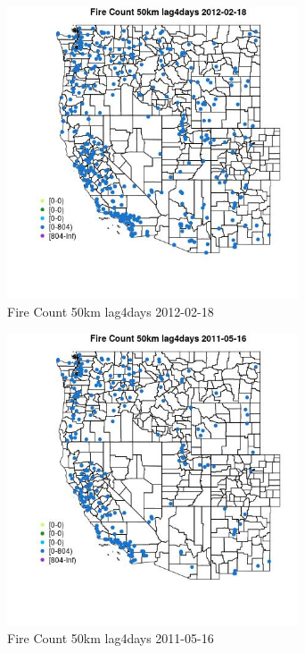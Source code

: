 \begin{figure} 
\centering  
\includegraphics[width=0.77\textwidth]{Code_Outputs/Report_ML_input_PM25_Step4_part_f_de_duplicated_aveswNAs_MapObsFire_Count_50km_lag4days2012-02-18.jpg} 
\caption{\label{fig:Report_ML_input_PM25_Step4_part_f_de_duplicated_aveswNAsMapObsFire_Count_50km_lag4days2012-02-18}Fire Count 50km lag4days 2012-02-18} 
\end{figure} 
 

\begin{figure} 
\centering  
\includegraphics[width=0.77\textwidth]{Code_Outputs/Report_ML_input_PM25_Step4_part_f_de_duplicated_aveswNAs_MapObsFire_Count_50km_lag4days2011-05-16.jpg} 
\caption{\label{fig:Report_ML_input_PM25_Step4_part_f_de_duplicated_aveswNAsMapObsFire_Count_50km_lag4days2011-05-16}Fire Count 50km lag4days 2011-05-16} 
\end{figure} 
 

